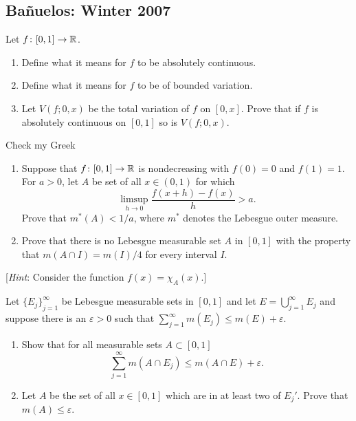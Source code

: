 \subsection{Bañuelos: Winter 2007}
\setcounter{exercise}{0}
\begin{problem}
  Let $f\colon[0,1]\to\mathbb{R}$.
  \begin{enumerate}[label=(\roman*),noitemsep]
  \item Define what it means for $f$ to be absolutely continuous.
  \item Define what it means for $f$ to be of bounded variation.
  \item Let $V(f;0,x)$ be the total variation of $f$ on $[0,x]$. Prove that
    if $f$ is absolutely continuous on $[0,1]$ so is $V(f;0,x)$.
  \end{enumerate}
\end{problem}
\begin{solution}
  Check my  Greek
\end{solution}

\begin{problem}
  \hfill
  \begin{enumerate}[label=(\roman*),noitemsep]
  \item Suppose that $f\colon[0,1]\to\mathbb{R}$ is nondecreasing with $f(0)=0$
    and $f(1)=1$. For $a>0$, let $A$ be set of all $x\in(0,1)$ for which
    \[
      \limsup_{h\to 0}\frac{f(x+h)-f(x)}{h}>a.
    \]
    Prove that $m^*(A)<1/a$, where $m^*$ denotes the Lebesgue outer
    measure.
  \item Prove that there is no Lebesgue measurable set $A$ in $[0,1]$ with
    the property that $m(A\cap I)=m(I)/4$ for every interval $I$.
  \end{enumerate}
  [\emph{Hint}: Consider the function $f(x)=\chi_A(x)$.]
\end{problem}
\begin{solution}
\end{solution}

\begin{problem}
  Let ${\{E_j\}}_{j=1}^\infty$ be Lebesgue measurable sets in $[0,1]$ and
  let $E=\bigcup_{j=1}^\infty E_j$ and suppose there is an $\varepsilon>0$
  such that $\sum_{j=1}^\infty m(E_j)\leq m(E)+\varepsilon$.
  \begin{enumerate}[label=(\roman*),noitemsep]
  \item Show that for all measurable sets $A\subset[0,1]$
    \[
      \sum_{j=1}^\infty m(A\cap E_j)\leq m(A\cap E)+\varepsilon.
    \]
  \item Let $A$ be the set of all $x\in[0,1]$ which are in at least two of
    $E_j'$. Prove that $m(A)\leq\varepsilon$.
  \end{enumerate}
\end{problem}
\begin{solution}
\end{solution}

